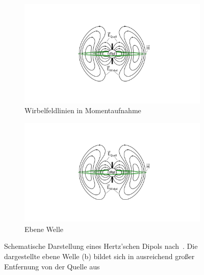 \begin{figure}[ht]
    \centering
    \begin{subfigure}[b]{0.4\textwidth}
        \includegraphics[page = 1, height=0.2\textheight, trim = 10cm 4cm 9.5cm 4cm, clip]{Abbildungen/Kapitel2/Hertz-Dipol.pdf}
        \caption{Wirbelfeldlinien in Momentaufnahme}\label{subfig:2_Hertzscher_Dipol_A}
    \end{subfigure}
    \hspace{1cm}
    \begin{subfigure}[b]{0.4\textwidth}
        \includegraphics[page = 2, height=0.2\textheight, trim = 4.5cm 0cm 8cm 0cm, clip]{Abbildungen/Kapitel2/Hertz-Dipol.pdf}
        \caption{Ebene Welle}\label{subfig:2_Hertzscher_Dipol_B}
    \end{subfigure}
    \caption[Schematische Darstellung eines Hertz'schen Dipols]{Schematische Darstellung eines Hertz'schen Dipols nach~\cite{EM_Schirmung}. Die dargestellte ebene Welle (b) bildet sich in ausreichend großer Entfernung von der Quelle aus}
    \label{fig:2_Hertzscher_Dipol}
\end{figure}


